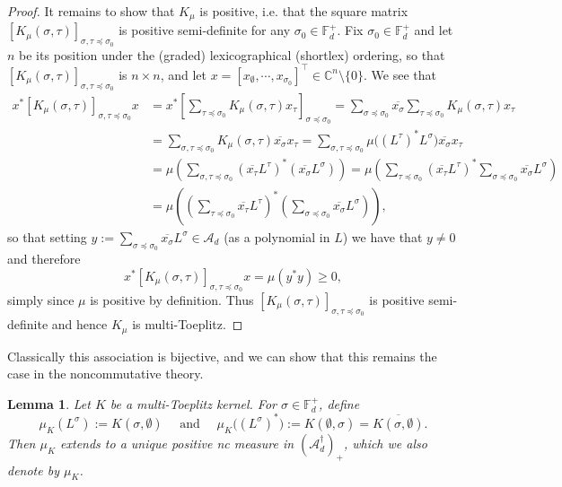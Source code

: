 \documentclass[11pt,reqno]{amsart}
\newcommand\ncm[1]{(\mathscr{A}_{#1}^{\dagger})_+}
\def\s{\sigma}
\def\t{\tau}
\def\CC{\mathbb{C}}
\def\FF{\mathbb{F}}
\newtheorem{lemma}[theorem]{Lemma}
\theoremstyle{definition}
\numberwithin{equation}{section}
\begin{document}
\begin{proof}
    It remains to show that \(K_\mu\) is positive, i.e. that the square matrix \([K_{\mu}(\s,\t)]_{\s,\t \preceq \s_0}\) is positive semi-definite for any \(\s_0 \in \FF_d^+\). Fix \(\s_0 \in \FF_d^+\) and let \(n\) be its position under the (graded) lexicographical (shortlex) ordering, so that \([K_{\mu}(\s,\t)]_{\s,\t \preceq \s_0}\) is \(n\times n\), and let \(x = [x_{\emptyset}, \cdots, x_{\s_0}]^{\top} \in \CC^{n}\setminus{\{0\}}\). We see that
    \begin{align*}
        x^*[K_{\mu}(\s,\t)]_{\s,\t \preceq \s_0}x & = x^* \left[\sum_{\t \preceq \s_0} K_\mu(\s,\t) x_{\t}\right]_{\s \preceq \s_0} =\sum_{\s \preceq \s_0} \overline{x_{\s}} \sum_{\t \preceq \s_0} K_\mu(\s,\t) x_{\t}\\ 
        & = \sum_{\s,\t \preceq \s_0} K_\mu(\s,\t) \overline{x_{\s}} x_{\t} = \sum_{\s,\t \preceq \s_0} \mu\big((L^\t)^* L^\s) \overline{x_{\s}} x_{\t} \\
        & = \mu\left( \sum_{\s,\t \preceq \s_0} (\overline{x_\t}L^\t)^*(\overline{x_\s}L^\s)\right) = \mu\left(\sum_{\t \preceq \s_0} (\overline{x_\t}L^\t)^* \sum_{\s \preceq \s_0} \overline{x_\s}L^\s \right)\\
        & = \mu\left(\left(\sum_{\t \preceq \s_0} \overline{x_\t}L^\t\right)^* \left(\sum_{\s \preceq \s_0} \overline{x_\s}L^\s\right) \right),
    \end{align*}
    so that setting \(y := \sum_{\s \preceq \s_0} \overline{x_\s}L^\s \in \mathcal{A}_d\) (as a polynomial in \(L\)) we have that \(y \neq 0\) and therefore
    \[
        x^*[K_{\mu}(\s,\t)]_{\s,\t \preceq \s_0}x = \mu(y^* y) \geq 0,
    \]
    simply since \(\mu\) is positive by definition. Thus \([K_{\mu}(\s,\t)]_{\s,\t \preceq \s_0}\) is positive semi-definite and hence \(K_\mu\) is multi-Toeplitz.
\end{proof}

Classically this association is bijective, and we can show that this remains the case in the noncommutative theory. 

\begin{lemma}
    \label{lem:Correspondence2}
    Let \(K\) be a multi-Toeplitz kernel. For \(\s \in \FF_d^+\), define
    \[
        \mu_K(L^\s) := K(\s, \emptyset) \quad \text{ and } \quad \mu_K\big((L^\s)^*\big) := K(\emptyset, \s) = \overline{K(\s, \emptyset)}.
    \]
    Then \(\mu_K\) extends to a unique positive nc measure in \(\ncm{d}\), which we also denote by \(\mu_K\).
\end{lemma}
\end{document}
